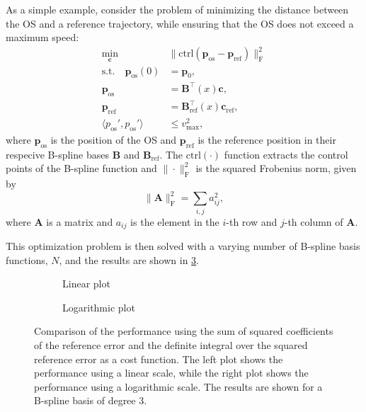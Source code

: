 As a simple example, consider the problem of minimizing the distance between the OS and a reference trajectory, while ensuring that the OS does not exceed a maximum speed:
\begin{equation}
    \begin{aligned}
        \min_{\mathbf c} \quad & \|\text{ctrl}(\mathbf p_\text{os} - \mathbf p_\text{ref})\|_\text{F}^2 \\
        \text{s.t.} \quad \mathbf p_\text{os}(0) &= \mathbf p_0, \\
                     \mathbf p_\text{os} &= \mathbf B^\top(x) \mathbf c, \\
                     \mathbf p_\text{ref} &= \mathbf B_\text{ref}^\top(x) \mathbf c_\text{ref}, \\
                     \langle p_\text{os}', p_\text{os}' \rangle &\le v_\text{max}^2,
    \end{aligned}
\end{equation}
where $\mathbf p_\text{os}$ is the position of the OS and $\mathbf p_\text{ref}$ is the reference position in their respecive B-spline bases $\mathbf B$ and $\mathbf B_\text{ref}$. The $\text{ctrl}(\cdot)$ function extracts the control points of the B-spline function and $\|\cdot\|_\text{F}^2$ is the squared Frobenius norm, given by
\begin{equation}
    \|\mathbf A\|_\text{F}^2 = \sum_{i,j} a_{ij}^2,
\end{equation}
where $\mathbf A$ is a matrix and $a_{ij}$ is the element in the $i$-th row and $j$-th column of $\mathbf A$. 
 
This optimization problem is then solved with a varying number of B-spline basis functions, $N$, and the results are shown in \cref{fig:conservativeness}. 

\begin{figure}
    \centering
    \begin{subfigure}[b]{\textwidth}
        \centering
        
        \caption{Linear plot}
        \label{fig:sq-err-deg-3-linear}
    \end{subfigure}
    \begin{subfigure}[b]{\textwidth}
        \centering
        
        \caption{Logarithmic plot}
        \label{fig:sq-err-deg-3-log}
    \end{subfigure}
    \caption{Comparison of the performance using the sum of squared coefficients of the reference error and the definite integral over the squared reference error as a cost function. The left plot shows the performance using a linear scale, while the right plot shows the performance using a logarithmic scale. The results are shown for a B-spline basis of degree 3.}
    \label{fig:conservativeness}
\end{figure}
